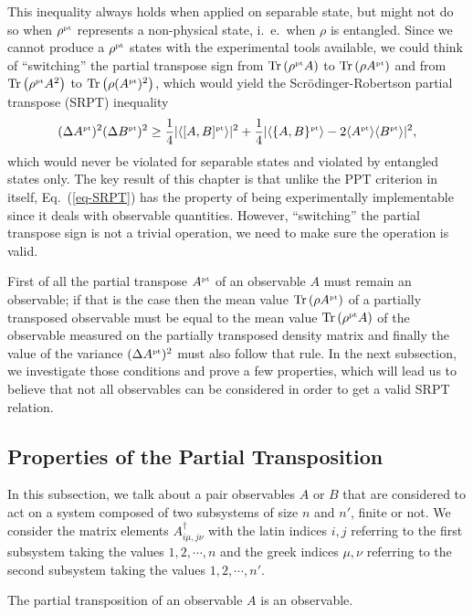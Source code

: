 This inequality always holds when applied on separable state, but might not do so when $\rho^{\mbox{\tiny \textup{pt}}}$ represents a non-physical state, i.~e.~when $\rho$ is entangled. Since we cannot produce a $\rho^{\mbox{\tiny \textup{pt}}}$ states with the experimental tools available, we could think of ``switching'' the partial transpose sign from $ \mbox{\textup{Tr}}\left( \rho^{\mbox{\tiny \textup{pt}}} A \right)$ to $ \mbox{\textup{Tr}}\left(  \rho A^{\mbox{\tiny \textup{pt}}} \right)$ and from $\mbox{\textup{Tr}}\left( \rho^{\mbox{\tiny \textup{pt}}} A^2 \right)$ to $\mbox{\textup{Tr}}\left(  \rho (A^{\mbox{\tiny \textup{pt}}})^2 \right)$, which would yield the Scr\"odinger-Robertson partial transpose (SRPT) inequality
\[  (\Delta A^{\mbox{\tiny \textup{pt}}})^2 (\Delta B^{\mbox{\tiny \textup{pt}}})^2 \ge \frac{1}{4} | \langle [A,B]^{\mbox{\tiny \textup{pt}}} \rangle |^2  +  \frac{1}{4} | \langle \{ A,B \}^{\mbox{\tiny \textup{pt}}} \rangle  - 2 \langle A^{\mbox{\tiny \textup{pt}}} \rangle \langle B^{\mbox{\tiny \textup{pt}}} \rangle |^2 , \label{eq-SRPT} \]
which would never be violated for separable states and violated by entangled states only. The key result of this chapter is that unlike the PPT criterion in itself, Eq.~(\ref{eq-SRPT}) has the property of being experimentally implementable since it deals with observable quantities. However, ``switching'' the partial transpose sign is not a trivial operation, we need to make sure the operation is valid. 

First of all the partial transpose $A^{\mbox{\tiny \textup{pt}}}$ of an observable $A$ must remain an observable; if that is the case then the mean value $ \mbox{\textup{Tr}}\left( \rho A^{\mbox{\tiny \textup{pt}}} \right)$ of a partially transposed observable must be equal to the mean value $ \mbox{\textup{Tr}}\left( \rho^{\mbox{\tiny \textup{pt}}} A \right)$ of the observable measured on the partially transposed density matrix and finally the value of the variance $(\Delta A^{\mbox{\tiny \textup{pt}}})^2$ must also follow that rule. In the next subsection, we investigate those conditions and prove a few properties, which will lead us to believe that not all observables can be considered in order to get a valid SRPT relation.

\subsection{Properties of the Partial Transposition}

In this subsection, we talk about a pair observables $A$ or $B$ that are considered to act on a system composed of two subsystems of size $n$ and $n'$, finite or not. We consider the matrix elements $A^\dagger_{i\mu,j\nu}$ with the latin indices $i,j$ referring to the first subsystem taking the values $1,2,\cdots,n$ and the greek indices $\mu,\nu$ referring to the second subsystem taking the values $1,2,\cdots,n'$.

\setcounter{prop}{0}

\begin{prop} \label{prop-herm}
The partial transposition of an observable $A$ is an observable.
\end{prop}

